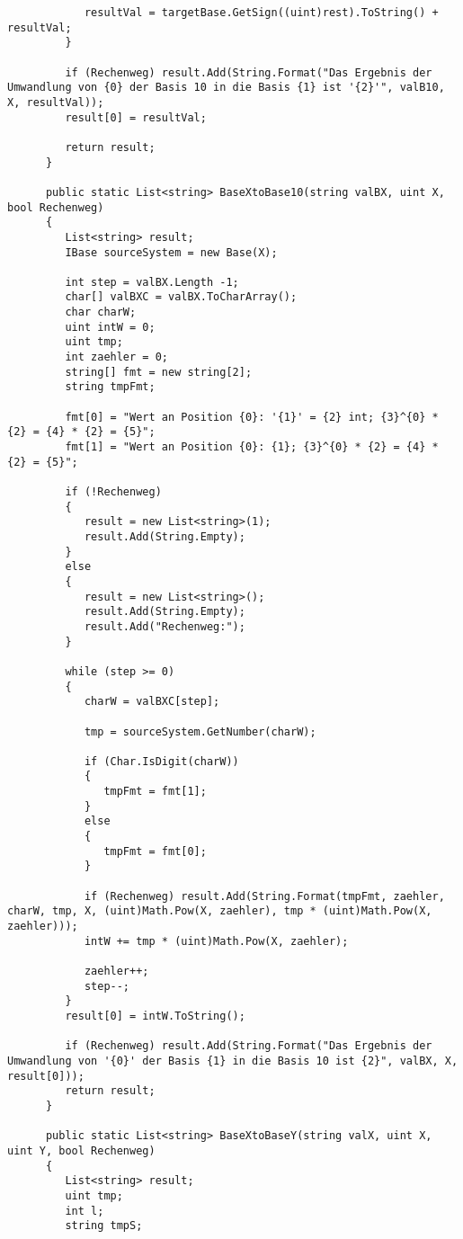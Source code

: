\begin{lstlisting}
            resultVal = targetBase.GetSign((uint)rest).ToString() + resultVal;
         }
         
         if (Rechenweg) result.Add(String.Format("Das Ergebnis der Umwandlung von {0} der Basis 10 in die Basis {1} ist '{2}'", valB10, X, resultVal));
         result[0] = resultVal;
         
         return result;
      }
      
      public static List<string> BaseXtoBase10(string valBX, uint X, bool Rechenweg)
      {
         List<string> result;
         IBase sourceSystem = new Base(X);
         
         int step = valBX.Length -1;
         char[] valBXC = valBX.ToCharArray();
         char charW;
         uint intW = 0;
         uint tmp;
         int zaehler = 0;
         string[] fmt = new string[2];
         string tmpFmt;
         
         fmt[0] = "Wert an Position {0}: '{1}' = {2} int; {3}^{0} * {2} = {4} * {2} = {5}";
         fmt[1] = "Wert an Position {0}: {1}; {3}^{0} * {2} = {4} * {2} = {5}";
         
         if (!Rechenweg)
         {
            result = new List<string>(1);
            result.Add(String.Empty);
         }
         else
         {
            result = new List<string>();
            result.Add(String.Empty);
            result.Add("Rechenweg:");
         }
         
         while (step >= 0)
         {
            charW = valBXC[step];
            
            tmp = sourceSystem.GetNumber(charW);
            
            if (Char.IsDigit(charW))
            {
               tmpFmt = fmt[1];
            }
            else
            {
               tmpFmt = fmt[0];
            }
            
            if (Rechenweg) result.Add(String.Format(tmpFmt, zaehler, charW, tmp, X, (uint)Math.Pow(X, zaehler), tmp * (uint)Math.Pow(X, zaehler)));
            intW += tmp * (uint)Math.Pow(X, zaehler);
            
            zaehler++;
            step--;
         }
         result[0] = intW.ToString();
         
         if (Rechenweg) result.Add(String.Format("Das Ergebnis der Umwandlung von '{0}' der Basis {1} in die Basis 10 ist {2}", valBX, X, result[0]));
         return result;
      }
      
      public static List<string> BaseXtoBaseY(string valX, uint X, uint Y, bool Rechenweg)
      {
         List<string> result;
         uint tmp;
         int l;
         string tmpS;
         

\end{lstlisting}

